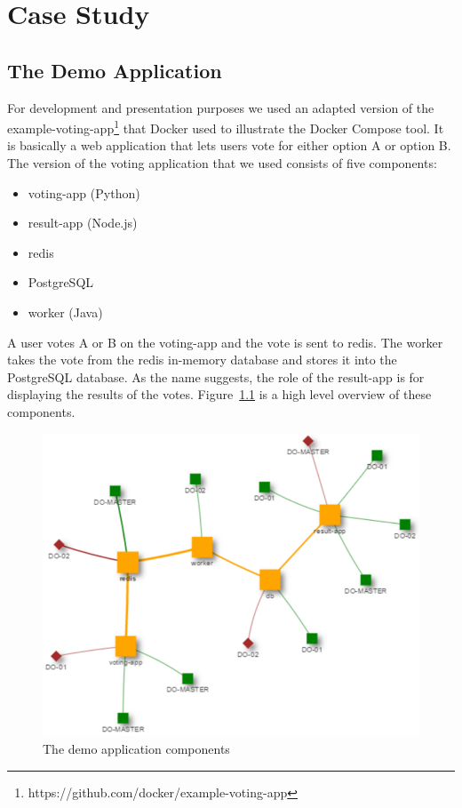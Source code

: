 \documentclass{seal_thesis}
\begin{document}
\chapter{Case Study}\label{ch:casestudy}

\section{The Demo Application}
For development and presentation purposes we used an adapted version of the example-voting-app\footnote{https://github.com/docker/example-voting-app} that Docker used to illustrate the Docker Compose tool.
It is basically a web application that lets users vote for either option A or option B.
The version of the voting application that we used consists of five components:
\begin{itemize}
	\item voting-app (Python)
	\item result-app (Node.js)
	\item redis
	\item PostgreSQL
	\item worker (Java)
\end{itemize}
A user votes A or B on the voting-app and the vote is sent to redis.
The worker takes the vote from the redis in-memory database and stores it into the PostgreSQL database.
As the name suggests, the role of the result-app is for displaying the results of the votes.
Figure~\ref{fig:demoapp} is a high level overview of these components.

\begin{figure}[!ht]
\centering
	\includegraphics[width=\textwidth]{gla.png}
	\caption{The demo application components}
	\label{fig:demoapp}
\end{figure}
\end{document}
